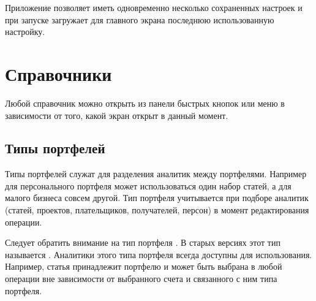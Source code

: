 \documentclass[a4paper,10pt,russian]{sphinxmanual}
\begin{document}
\noindent{}

\sphinxAtStartPar
Приложение позволяет иметь одновременно несколько сохраненных настроек и
при запуске загружает для главного экрана последнюю использованную настройку.

\sphinxstepscope


\chapter{Справочники}
\label{\detokenize{directories:chapter-directories}}\label{\detokenize{directories:id1}}\label{\detokenize{directories::doc}}
\sphinxAtStartPar
Любой справочник можно открыть из панели быстрых кнопок или меню  в зависимости от того,
какой экран открыт в данный момент.

\noindent{}

\noindent{}


\section{Типы портфелей}
\label{\detokenize{directories:id2}}
\sphinxAtStartPar
Типы портфелей служат для разделения аналитик между портфелями. Например для персонального портфеля
может использоваться один набор статей, а для малого бизнеса совсем другой.
Тип портфеля учитывается при подборе аналитик (статей, проектов, плательщиков, получателей, персон) в
момент редактирования операции.

\noindent{}

\noindent{}

\noindent{}

\sphinxAtStartPar
Следует обратить внимание на тип портфеля . В старых версиях этот тип называется .
Аналитики этого типа портфеля всегда доступны для использования. Например, статья 
принадлежит портфелю  и может быть выбрана в любой операции вне зависимости от выбранного счета и
связанного с ним типа портфеля.
\end{document}
